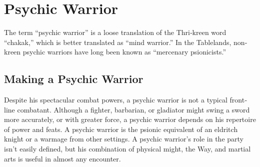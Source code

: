 \section{Psychic Warrior}

The term “psychic warrior” is a loose translation of the Thri‐kreen word “chakak,” which is better translated as “mind warrior.” In the Tablelands, non‐kreen psychic warriors have long been known as “mercenary psionicists.”


\subsection{Making a Psychic Warrior}
Despite his spectacular combat powers, a psychic warrior is not a typical front‐line combatant. Although a fighter, barbarian, or gladiator might swing a sword more accurately, or with greater force, a psychic warrior depends on his repertoire of power and feats. A psychic warrior is the psionic equivalent of an eldritch knight or a warmage from other settings. A psychic warrior’s role in the party isn’t easily defined, but his combination of physical might, the Way, and martial arts is useful in almost any encounter.

